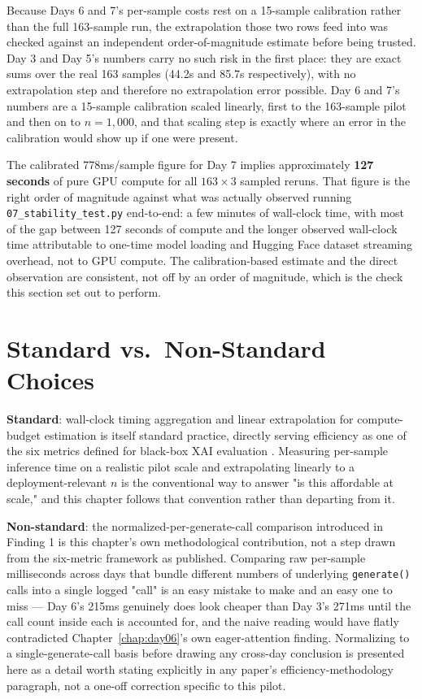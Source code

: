 Because Days 6 and 7's per-sample costs rest on a 15-sample calibration rather than the full
163-sample run, the extrapolation those two rows feed into was checked against an independent
order-of-magnitude estimate before being trusted. Day 3 and Day 5's numbers carry no such risk in
the first place: they are exact sums over the real 163 samples (44.2s and 85.7s respectively), with
no extrapolation step and therefore no extrapolation error possible. Day 6 and 7's numbers are a
15-sample calibration scaled linearly, first to the 163-sample pilot and then on to $n=1{,}000$, and
that scaling step is exactly where an error in the calibration would show up if one were present.

The calibrated 778ms/sample figure for Day 7 implies approximately \textbf{127 seconds} of pure GPU
compute for all $163 \times 3$ sampled reruns. That figure is the right order of magnitude against
what was actually observed running \texttt{07\_stability\_test.py} end-to-end: a few minutes of
wall-clock time, with most of the gap between 127 seconds of compute and the longer observed
wall-clock time attributable to one-time model loading and Hugging Face dataset streaming overhead,
not to GPU compute. The calibration-based estimate and the direct observation are consistent, not
off by an order of magnitude, which is the check this section set out to perform.

\section{Standard vs.\ Non-Standard Choices}

\textbf{Standard}: wall-clock timing aggregation and linear extrapolation for compute-budget
estimation is itself standard practice, directly serving efficiency as one of the six metrics
defined for black-box XAI evaluation \citep{arreche2024exai}. Measuring per-sample inference time on
a realistic pilot scale and extrapolating linearly to a deployment-relevant $n$ is the conventional
way to answer "is this affordable at scale," and this chapter follows that convention rather than
departing from it.

\textbf{Non-standard}: the normalized-per-generate-call comparison introduced in Finding 1 is this
chapter's own methodological contribution, not a step drawn from the six-metric framework as
published. Comparing raw per-sample milliseconds across days that bundle different numbers of
underlying \texttt{generate()} calls into a single logged "call" is an easy mistake to make and an
easy one to miss --- Day 6's 215ms genuinely does look cheaper than Day 3's 271ms until the call
count inside each is accounted for, and the naive reading would have flatly contradicted
Chapter~\ref{chap:day06}'s own eager-attention finding. Normalizing to a single-generate-call basis
before drawing any cross-day conclusion is presented here as a detail worth stating explicitly in
any paper's efficiency-methodology paragraph, not a one-off correction specific to this pilot.

